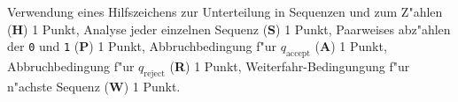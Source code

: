 \begin{bewertung}
Verwendung eines Hilfszeichens zur Unterteilung in Sequenzen
und zum Z"ahlen ({\bf H}) 1 Punkt,
Analyse jeder einzelnen Sequenz ({\bf S}) 1 Punkt,
Paarweises abz"ahlen der {\tt 0} und {\tt 1} ({\bf P}) 1 Punkt,
Abbruchbedingung f"ur $q_{\text{accept}}$ ({\bf A}) 1 Punkt,
Abbruchbedingung f"ur $q_{\text{reject}}$ ({\bf R}) 1 Punkt,
Weiterfahr-Bedingungung f"ur n"achste Sequenz ({\bf W}) 1 Punkt.
\end{bewertung}


